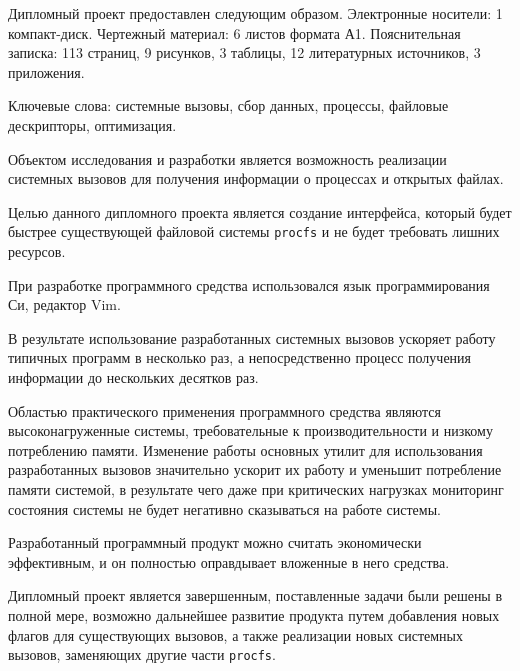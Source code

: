 \begin{titlepage}
\label{sec:ref}

Дипломный проект предоставлен следующим образом. Электронные носители: 1
компакт-диск. Чертежный материал: 6 листов формата А1. Пояснительная записка:
113 страниц, 9 рисунков, 3 таблицы, 12 литературных источников, 3 приложения.

Ключевые слова: системные вызовы, сбор данных, процессы, файловые дескрипторы,
оптимизация.

Объектом исследования и разработки является возможность реализации системных
вызовов для получения информации о процессах и открытых файлах.

Целью данного дипломного проекта является создание интерфейса, который будет
быстрее существующей файловой системы \texttt{procfs} и не будет требовать
лишних ресурсов.

При разработке программного средства использовался язык программирования Си,
редактор Vim. 

В результате использование разработанных системных вызовов ускоряет работу
типичных программ в несколько раз, а непосредственно процесс получения
информации до нескольких десятков раз.

Областью практического применения программного средства являются
высоконагруженные системы, требовательные к производительности и низкому
потреблению памяти. Изменение работы основных утилит для использования
разработанных вызовов значительно ускорит их работу и уменьшит потребление
памяти системой, в результате чего даже при критических нагрузках мониторинг
состояния системы не будет негативно сказываться на работе системы.

Разработанный программный продукт можно считать экономически эффективным, и он
полностью оправдывает вложенные в него средства.

Дипломный проект является завершенным, поставленные задачи были решены в полной
мере, возможно дальнейшее развитие продукта путем добавления новых флагов для
существующих вызовов, а также реализации новых системных вызовов, заменяющих
другие части \texttt{procfs}.
\end{titlepage}
